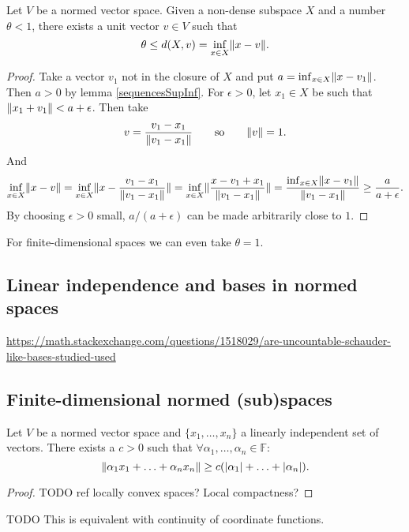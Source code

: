 \begin{lemma} \label{RieszsLemma}
Let $V$ be a normed vector space. Given a non-dense subspace $X$ and a number $\theta<1$, there exists a unit vector $v\in V$ such that
\[ \theta \leq d(X,v) = \inf_{x\in X}\lVert x-v\rVert. \]
\end{lemma}
\begin{proof}
Take a vector $v_1$ not in the closure of $X$ and put $a = \inf_{x\in X}\lVert x-v_1\rVert$. Then $a>0$ by lemma \ref{sequencesSupInf}. For $\epsilon > 0$, let $x_1\in X$ be such that $\lVert x_1+v_1\rVert<a+\epsilon$. Then take
\[ v = \frac{v_1 - x_1}{\lVert v_1-x_1\rVert} \qquad \text{so} \qquad \lVert v\rVert=1. \]
And
\[ \inf_{x\in X}\lVert x-v\rVert = \inf_{x\in X}\lVert x-\frac{v_1 - x_1}{\lVert v_1-x_1\rVert}\rVert = \inf_{x\in X}\lVert\frac{x-v_1 + x_1}{\lVert v_1-x_1\rVert}\rVert = \frac{\inf_{x\in X}\lVert x-v_1\rVert}{\lVert v_1-x_1\rVert} \geq \frac{a}{a+\epsilon}. \]
By choosing $\epsilon >0$ small, $a/(a+\epsilon)$ can be made arbitrarily close to $1$.
\end{proof}
For finite-dimensional spaces we can even take $\theta=1$.

\subsection{Linear independence and bases in normed spaces}
\url{https://math.stackexchange.com/questions/1518029/are-uncountable-schauder-like-bases-studied-used}

\subsection{Finite-dimensional normed (sub)spaces}

\begin{lemma} \label{coordinateContinuity}
Let $V$ be a normed vector space and $\{x_1, \ldots, x_n\}$ a linearly independent set of vectors. There exists a $c>0$ such that $\forall \alpha_1,\ldots, \alpha_n \in \mathbb{F}$:
\[ \lVert\alpha_1x_1 + \ldots + \alpha_nx_n\rVert \geq c(|\alpha_1|+\ldots+|\alpha_n|) . \]
\end{lemma}
\begin{proof}
TODO ref locally convex spaces? Local compactness?
\end{proof}
TODO This is equivalent with continuity of coordinate functions.

